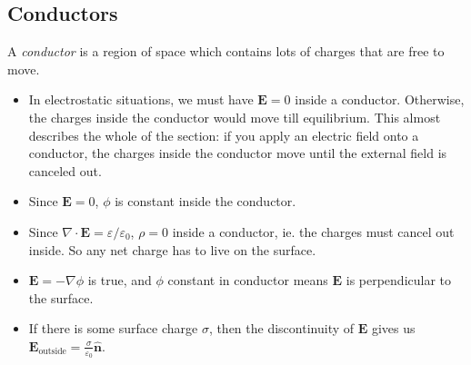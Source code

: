 \documentclass[a4paper]{article}
\begin{document}
\subsection{Conductors}
\begin{defi}[Conductor]
  A \emph{conductor} is a region of space which contains lots of charges that are free to move.
\end{defi}
\note
\begin{itemize}
  \item In electrostatic situations, we must have $\mathbf{E} = 0$ inside a conductor. Otherwise, the charges inside the conductor would move till equilibrium. This almost describes the whole of the section: if you apply an electric field onto a conductor, the charges inside the conductor move until the external field is canceled out.
  \item Since $\mathbf{E} = 0$, $\phi$ is constant inside the conductor.
  \item Since $\nabla \cdot \mathbf{E} = \varepsilon/\varepsilon_0$, $\rho = 0$ inside a conductor, ie. the charges must cancel out inside. So any net charge has to live on the surface.
  \item $\mathbf{E} = -\nabla \phi$ is true, and $\phi$ constant in conductor means $\mathbf{E}$ is perpendicular to the surface.
  \item If there is some surface charge $\sigma$, then the discontinuity of $\mathbf{E}$ gives us $\mathbf{E}_\text{outside} = \frac{\sigma}{\varepsilon_0} \hat{\mathbf{n}}$.
\end{itemize}
\end{document}
